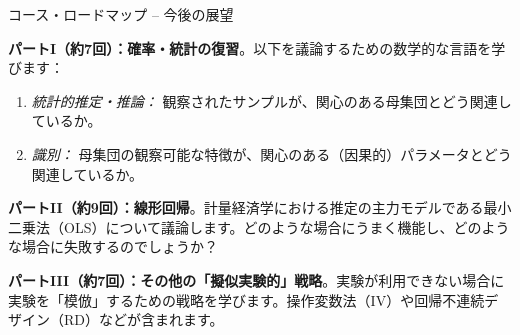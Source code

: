 \documentclass[11pt,handout]{beamer}
\newenvironment{wideitemize}{\itemize\addtolength{\itemsep}{10pt}}{\enditemize}
\begin{document}
\begin{frame}{コース・ロードマップ -- 今後の展望}
	\begin{wideitemize}
		\item
		\textbf{パートI（約7回）：確率・統計の復習}。以下を議論するための数学的な言語を学びます：
		
			\begin{enumerate}
				\item 
				\textit{統計的推定・推論：} 観察されたサンプルが、関心のある母集団とどう関連しているか。
				
				\item
				\textit{識別：} 母集団の観察可能な特徴が、関心のある（因果的）パラメータとどう関連しているか。
			\end{enumerate}
		\pause 
		
		\item
		\textbf{パートII（約9回）：線形回帰}。計量経済学における推定の主力モデルである最小二乗法（OLS）について議論します。どのような場合にうまく機能し、どのような場合に失敗するのでしょうか？
		
		\pause
		\item
		\textbf{パートIII（約7回）：その他の「擬似実験的」戦略}。実験が利用できない場合に実験を「模倣」するための戦略を学びます。操作変数法（IV）や回帰不連続デザイン（RD）などが含まれます。
			 
	\end{wideitemize}
\end{frame}
\end{document}
